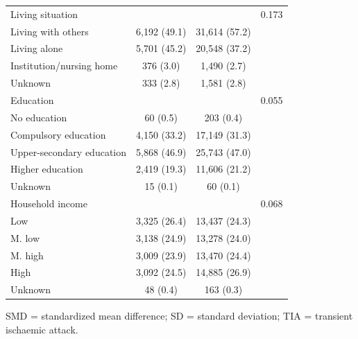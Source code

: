 \begin{table}[htbp]
\begin{threeparttable}
\begin{tabularx}{\textwidth}{@{}Xccc@{}}
      Living situation                   &               &               & 0.173 \\ \quad Living with others & 6,192 (49.1)        &
      31,614 (57.2)                      &                                       \\ \quad Living alone & 5,701 (45.2) & 20,548 (37.2) & \\ \quad
      Institution/nursing home           & 376 (3.0)     & 1,490 (2.7)   &       \\ \quad Unknown & 333
      (2.8)                              & 1,581 (2.8)   &                       \\

      Education                          &               &               & 0.055 \\ \quad No education & 60 (0.5) & 203 (0.4) & \\ \quad
      Compulsory education               & 4,150 (33.2)  & 17,149 (31.3) &       \\ \quad Upper-secondary
      education                          & 5,868 (46.9)  & 25,743 (47.0) &       \\ \quad Higher education & 2,419
      (19.3)                             & 11,606 (21.2) &                       \\ \quad Unknown & 15 (0.1) & 60 (0.1) & \\

      Household income                   &               &               & 0.068 \\ \quad Low & 3,325 (26.4) & 13,437 (24.3) & \\
      \quad M. low                       & 3,138 (24.9)  & 13,278 (24.0) &       \\ \quad M. high & 3,009 (23.9)       &
      13,470 (24.4)                      &                                       \\ \quad High & 3,092 (24.5) & 14,885 (26.9) & \\ \quad Unknown
                                         & 48 (0.4)      & 163 (0.3)     &       \\

      \bottomrule
    \end{tabularx}

    \begin{tablenotes}
      \footnotesize
      \item
      SMD = standardized mean difference;
      SD = standard deviation;
      TIA = transient ischaemic attack.
    \end{tablenotes}

  \end{threeparttable}
\end{table}
